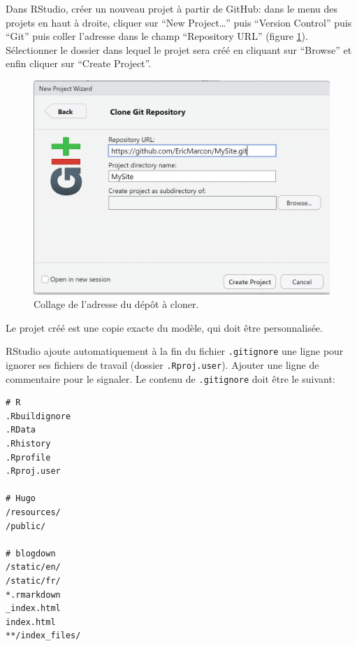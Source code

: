 \documentclass[
  12pt,
  french,
  a4paper,
  extrafontsizes,onecolumn,openright
  ]{memoir}
\begin{document}
\normalsize

Dans RStudio, créer un nouveau projet à partir de GitHub: dans le menu des projets en haut à droite, cliquer sur \enquote{New Project\ldots{}} puis \enquote{Version Control} puis \enquote{Git} puis coller l'adresse dans le champ \enquote{Repository URL} (figure \ref{fig:rediger-Projet-GitHub}).
Sélectionner le dossier dans lequel le projet sera créé en cliquant sur \enquote{Browse} et enfin cliquer sur \enquote{Create Project}.



\scriptsize

\begin{figure}

{\centering \includegraphics[width=0.8\linewidth]{images/rediger-Projet-GitHub} 

}

\caption{Collage de l'adresse du dépôt à cloner.}\label{fig:rediger-Projet-GitHub}
\end{figure}

\normalsize

Le projet créé est une copie exacte du modèle, qui doit être personnalisée.

RStudio ajoute automatiquement à la fin du fichier \texttt{.gitignore} une ligne pour ignorer ses fichiers de travail (dossier \texttt{.Rproj.user}).
Ajouter une ligne de commentaire pour le signaler.
Le contenu de \texttt{.gitignore} doit être le suivant:

\begin{verbatim}
# R
.Rbuildignore
.RData
.Rhistory
.Rprofile
.Rproj.user

# Hugo
/resources/
/public/

# blogdown
/static/en/
/static/fr/
*.rmarkdown
_index.html
index.html
**/index_files/
\end{verbatim}
\end{document}

